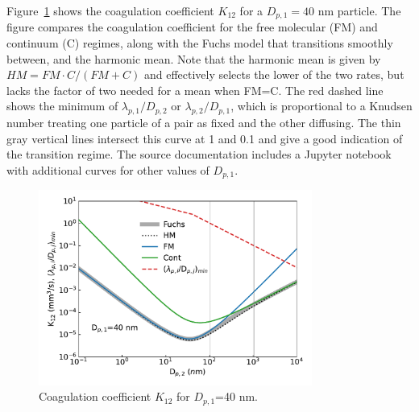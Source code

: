 \documentclass[preprint,letterpaper]{elsarticle}
\begin{document}
Figure~\ref{f:coagulation} shows the coagulation coefficient $K_12$ for a $D_{p,1}=40$ nm particle. The figure compares the coagulation coefficient for the free molecular (FM) and continuum (C) regimes, along with the Fuchs model that transitions smoothly between, and the harmonic mean. Note that the harmonic mean is given by $HM=FM\cdot C/(FM+C)$ and effectively selects the lower of the two rates, but lacks the factor of two needed for a mean when FM=C. The red dashed line shows the minimum of $\lambda_{p,1}/D_{p,2}$ or $\lambda_{p,2}/D_{p,1}$, which is proportional to a Knudsen number treating one particle of a pair as fixed and the other diffusing. The thin gray vertical lines intersect this curve at 1 and 0.1 and give a good indication of the transition regime. The source documentation includes a Jupyter notebook with additional curves for other values of $D_{p,1}$.
%
\begin{figure}
    \begin{center}
        \includegraphics[width=0.8\textwidth]{../figures/coagulation.pdf}
    \end{center}
    \caption{Coagulation coefficient $K_{12}$ for $D_{p,1}$=40 nm.}
    \label{f:coagulation}
\end{figure}
%

\end{document}
